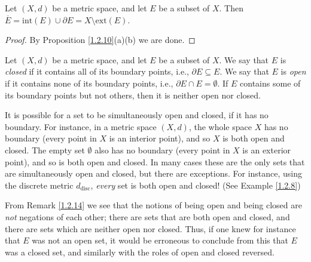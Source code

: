 \begin{corollary}\label{1.2.11}
    Let \((X, d)\) be a metric space, and let \(E\) be a subset of \(X\).
    Then \(\overline{E} = \text{int}(E) \cup \partial E = X \setminus \text{ext}(E)\).
\end{corollary}

\begin{proof}
    By Proposition \ref{1.2.10}(a)(b) we are done.
\end{proof}

\begin{definition}\label{1.2.12}
    Let \((X, d)\) be a metric space, and let \(E\) be a subset of \(X\).
    We say that \(E\) is \emph{closed} if it contains all of its boundary points, i.e., \(\partial E \subseteq E\).
    We say that \(E\) is \emph{open} if it contains none of its boundary points, i.e., \(\partial E \cap E = \emptyset\).
    If \(E\) contains some of its boundary points but not others, then it is neither open nor closed.
\end{definition}

\setcounter{theorem}{13}
\begin{remark}\label{1.2.14}
    It is possible for a set to be simultaneously open and closed, if it has no boundary.
    For instance, in a metric space \((X, d)\), the whole space \(X\) has no boundary (every point in \(X\) is an interior point), and so \(X\) is both open and closed.
    The empty set \(\emptyset\) also has no boundary (every point in \(X\) is an exterior point), and so is both open and closed.
    In many cases these are the only sets that are simultaneously open and closed, but there are exceptions.
    For instance, using the discrete metric \(d_{\text{disc}}\), \emph{every} set is both open and closed! (See Example \ref{1.2.8})
\end{remark}

\begin{note}
    From Remark \ref{1.2.14} we see that the notions of being open and being closed are \emph{not} negations of each other;
    there are sets that are both open and closed, and there are sets which are neither open nor closed.
    Thus, if one knew for instance that \(E\) was not an open set, it would be erroneous to conclude from this that \(E\) was a closed set, and similarly with the roles of open and closed reversed.
\end{note}

